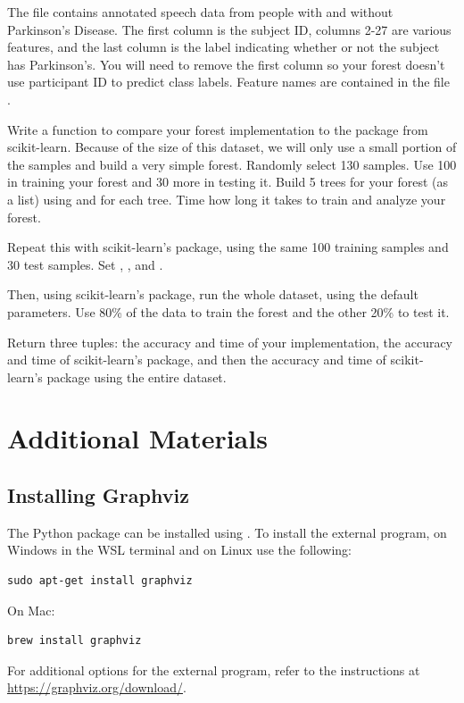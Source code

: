 \begin{problem}
The file  contains annotated speech data from people with and without Parkinson's Disease.
The first column is the subject ID, columns 2-27 are various features, and the last column is the label indicating whether or not the subject has Parkinson's.
You will need to remove the first column so your forest doesn't use participant ID to predict class labels.
Feature names are contained in the file .

Write a function to compare your forest implementation to the package from scikit-learn.
Because of the size of this dataset, we will only use a small portion of the samples and build a very simple forest.
Randomly select 130 samples.
Use 100 in training your forest and 30 more in testing it.
Build 5 trees for your forest (as a list) using  and  for each tree.
Time how long it takes to train and analyze your forest.

Repeat this with scikit-learn's package, using the same 100 training samples and 30 test samples.
Set , , and .

Then, using scikit-learn's package, run the whole  dataset, using the default parameters.
Use 80\% of the data to train the forest and the other 20\% to test it.

Return three tuples: the accuracy and time of your implementation, the accuracy and time of scikit-learn's package, and then the accuracy and time of scikit-learn's package using the entire dataset.
\end{problem}

\section*{Additional Materials}
\subsection*{Installing Graphviz}
The Python package can be installed using .
To install the external program,
on Windows in the WSL terminal and on Linux use the following:
\begin{lstlisting}
sudo apt-get install graphviz
\end{lstlisting}
On Mac:
\begin{lstlisting}
brew install graphviz
\end{lstlisting}
For additional options for the external program, refer to the instructions at \url{https://graphviz.org/download/}.
